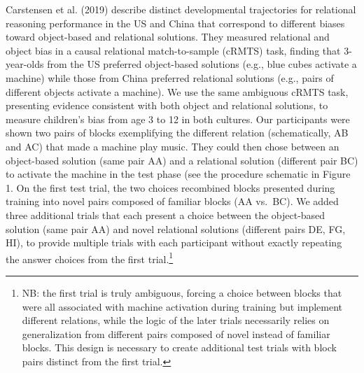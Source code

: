 \documentclass[10pt, letterpaper]{article}
\begin{document}
Carstensen et al. (2019) describe distinct developmental trajectories
for relational reasoning performance in the US and China that correspond
to different biases toward object-based and relational solutions. They
measured relational and object bias in a causal relational
match-to-sample (cRMTS) task, finding that 3-year-olds from the US
preferred object-based solutions (e.g., blue cubes activate a machine)
while those from China preferred relational solutions (e.g., pairs of
different objects activate a machine). We use the same ambiguous cRMTS
task, presenting evidence consistent with both object and relational
solutions, to measure children's bias from age 3 to 12 in both cultures.
Our participants were shown two pairs of blocks exemplifying the
different relation (schematically, AB and AC) that made a machine play
music. They could then chose between an object-based solution (same pair
AA) and a relational solution (different pair BC) to activate the
machine in the test phase (see the procedure schematic in Figure 1. On
the first test trial, the two choices recombined blocks presented during
training into novel pairs composed of familiar blocks (AA vs.~BC). We
added three additional trials that each present a choice between the
object-based solution (same pair AA) and novel relational solutions
(different pairs DE, FG, HI), to provide multiple trials with each
participant without exactly repeating the answer choices from the first
trial.\footnote{NB: the first trial is truly ambiguous, forcing a choice between blocks that were all associated with machine activation during training but implement different relations, while the logic of the later trials necessarily relies on generalization from different pairs composed of novel instead of familiar blocks. This design is necessary to create additional test trials with block pairs distinct from the first trial.}
\end{document}
